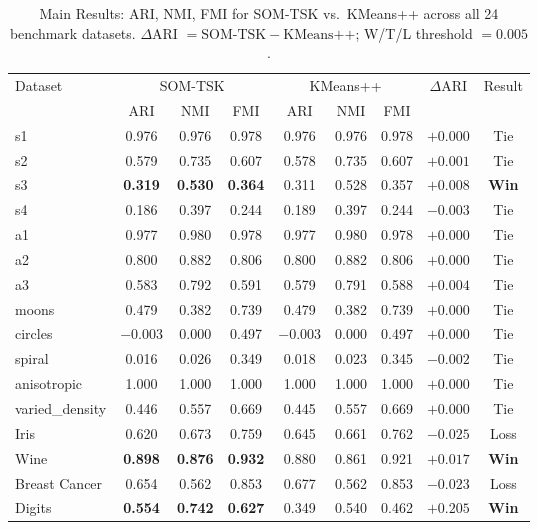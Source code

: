 \documentclass[journal]{IEEEtran}
\begin{document}
\begin{table}[!t]
\caption{Main Results: ARI, NMI, FMI for SOM-TSK vs.\ KMeans++ across all 24 benchmark datasets. $\Delta$ARI $= \text{SOM-TSK} - \text{KMeans++}$; W/T/L threshold $= 0.005$.}
\label{tab:main_results}
\centering
\renewcommand{\arraystretch}{1.05}
\setlength{\tabcolsep}{4pt}
\begin{tabular}{lcccccccc}
\toprule
\multirow{2}{*}{Dataset} & \multicolumn{3}{c}{SOM-TSK} & \multicolumn{3}{c}{KMeans++} & \multirow{2}{*}{$\Delta$ARI} & \multirow{2}{*}{Result} \\
\cmidrule(lr){2-4}\cmidrule(lr){5-7}
 & ARI & NMI & FMI & ARI & NMI & FMI & & \\
\midrule
s1 & 0.976 & 0.976 & 0.978 & 0.976 & 0.976 & 0.978 & $+0.000$ & Tie \\
s2 & 0.579 & 0.735 & 0.607 & 0.578 & 0.735 & 0.607 & $+0.001$ & Tie \\
s3 & \textbf{0.319} & \textbf{0.530} & \textbf{0.364} & 0.311 & 0.528 & 0.357 & $\mathbf{+0.008}$ & \textbf{Win} \\
s4 & 0.186 & 0.397 & 0.244 & 0.189 & 0.397 & 0.244 & $-0.003$ & Tie \\
a1 & 0.977 & 0.980 & 0.978 & 0.977 & 0.980 & 0.978 & $+0.000$ & Tie \\
a2 & 0.800 & 0.882 & 0.806 & 0.800 & 0.882 & 0.806 & $+0.000$ & Tie \\
a3 & 0.583 & 0.792 & 0.591 & 0.579 & 0.791 & 0.588 & $+0.004$ & Tie \\
moons & 0.479 & 0.382 & 0.739 & 0.479 & 0.382 & 0.739 & $+0.000$ & Tie \\
circles & $-0.003$ & 0.000 & 0.497 & $-0.003$ & 0.000 & 0.497 & $+0.000$ & Tie \\
spiral & 0.016 & 0.026 & 0.349 & 0.018 & 0.023 & 0.345 & $-0.002$ & Tie \\
anisotropic & 1.000 & 1.000 & 1.000 & 1.000 & 1.000 & 1.000 & $+0.000$ & Tie \\
varied\_density & 0.446 & 0.557 & 0.669 & 0.445 & 0.557 & 0.669 & $+0.000$ & Tie \\
Iris & 0.620 & 0.673 & 0.759 & 0.645 & 0.661 & 0.762 & $-0.025$ & Loss \\
Wine & \textbf{0.898} & \textbf{0.876} & \textbf{0.932} & 0.880 & 0.861 & 0.921 & $\mathbf{+0.017}$ & \textbf{Win} \\
Breast Cancer & 0.654 & 0.562 & 0.853 & 0.677 & 0.562 & 0.853 & $-0.023$ & Loss \\
Digits & \textbf{0.554} & \textbf{0.742} & \textbf{0.627} & 0.349 & 0.540 & 0.462 & $\mathbf{+0.205}$ & \textbf{Win} \\

\end{tabular}
\end{table}
\end{document}
